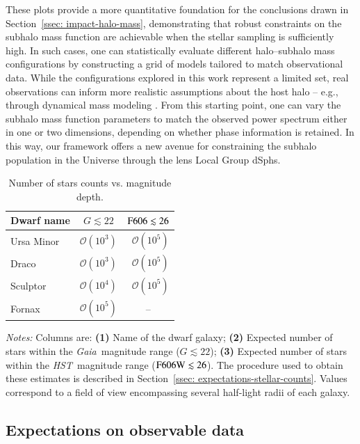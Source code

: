 \documentclass[fleqn,usenatbib]{mnras}
\newcommand{\gaia}{{\sl Gaia}}
\newcommand{\hst}{{\sl HST}}
\begin{document}
These plots provide a more quantitative foundation for the conclusions drawn in Section~\ref{ssec: impact-halo-mass}, demonstrating that robust constraints on the subhalo mass function are achievable when the stellar sampling is sufficiently high. In such cases, one can statistically evaluate different halo–subhalo mass configurations by constructing a grid of models tailored to match observational data. While the configurations explored in this work represent a limited set, real observations can inform more realistic assumptions about the host halo -- e.g., through dynamical mass modeling \citep[][]{Vitral+24, Arroyo-Polonio+25}. From this starting point, one can vary the subhalo mass function parameters to match the observed power spectrum either in one or two dimensions, depending on whether phase information is retained. In this way, our framework offers a new avenue for constraining the subhalo population in the Universe through the lens Local Group dSphs.



\begin{table}
\caption{Number of stars counts vs. magnitude depth.}
\label{tab: stellar-counts}
\centering
\renewcommand{\arraystretch}{1.5}
\tabcolsep=10pt
\footnotesize
\begin{tabular}{l|rr}
\hline\hline   
\multicolumn{1}{c}{Dwarf name} &
\multicolumn{1}{c}{$G \lesssim 22$} &
\multicolumn{1}{c}{${\rm F606} \lesssim 26$} \\ 
\hline
Ursa Minor  &  $\mathcal{O}(10^{3})$  &  $\mathcal{O}(10^{5})$ \\
Draco       &  $\mathcal{O}(10^{3})$  &  $\mathcal{O}(10^{5})$ \\
Sculptor    &  $\mathcal{O}(10^{4})$  &  $\mathcal{O}(10^{5})$ \\
Fornax    &  $\mathcal{O}(10^{5})$  &  \multicolumn{1}{c}{--} \\
\hline
\end{tabular}
\parbox{\hsize}{\textit{Notes:}
Columns are: \textbf{(1)} Name of the dwarf galaxy;
\textbf{(2)} Expected number of stars within the \gaia\ magnitude range ($G \lesssim 22$);
\textbf{(3)} Expected number of stars within the \hst\ magnitude range (${\rm F606W} \lesssim 26$).
The procedure used to obtain these estimates is described in Section~\ref{ssec: expectations-stellar-counts}.
Values correspond to a field of view encompassing several half-light radii of each galaxy.
}
\end{table}

\subsection{Expectations on observable data} 
\end{document}
